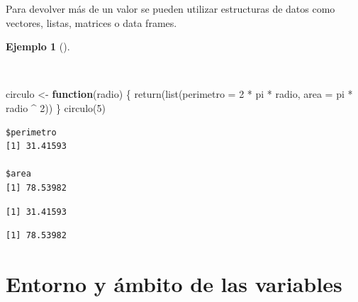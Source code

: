 \documentclass[
  spanish,
  a4paper,
]{scrreport}
\newenvironment{Shaded}{\begin{snugshade}}{\end{snugshade}}
\newcommand{\AttributeTok}[1]{\textcolor[rgb]{0.40,0.45,0.13}{#1}}
\newcommand{\ControlFlowTok}[1]{\textcolor[rgb]{0.00,0.23,0.31}{\textbf{#1}}}
\newcommand{\DecValTok}[1]{\textcolor[rgb]{0.68,0.00,0.00}{#1}}
\newcommand{\FunctionTok}[1]{\textcolor[rgb]{0.28,0.35,0.67}{#1}}
\newcommand{\NormalTok}[1]{\textcolor[rgb]{0.00,0.23,0.31}{#1}}
\newcommand{\OtherTok}[1]{\textcolor[rgb]{0.00,0.23,0.31}{#1}}
\newcommand{\SpecialCharTok}[1]{\textcolor[rgb]{0.37,0.37,0.37}{#1}}
\theoremstyle{definition}
\theoremstyle{definition}
\newtheorem{example}{Ejemplo}[chapter]
\theoremstyle{remark}
\begin{document}
Para devolver más de un valor se pueden utilizar estructuras de datos
como vectores, listas, matrices o data frames.

\begin{example}[]\protect\hypertarget{exm-retorno-funcion-lista}{}\label{exm-retorno-funcion-lista}

~

\begin{Shaded}
\begin{Highlighting}[]
\NormalTok{circulo }\OtherTok{\textless{}{-}} \ControlFlowTok{function}\NormalTok{(radio) \{}
  \FunctionTok{return}\NormalTok{(}\FunctionTok{list}\NormalTok{(}\AttributeTok{perimetro =} \DecValTok{2} \SpecialCharTok{*}\NormalTok{ pi }\SpecialCharTok{*}\NormalTok{ radio, }\AttributeTok{area =}\NormalTok{ pi }\SpecialCharTok{*}\NormalTok{ radio }\SpecialCharTok{\^{}} \DecValTok{2}\NormalTok{))}
\NormalTok{\}}
\FunctionTok{circulo}\NormalTok{(}\DecValTok{5}\NormalTok{)}
\end{Highlighting}
\end{Shaded}

\begin{verbatim}
$perimetro
[1] 31.41593

$area
[1] 78.53982
\end{verbatim}

\begin{Shaded}
\end{Shaded}

\begin{verbatim}
[1] 31.41593
\end{verbatim}

\begin{Shaded}
\end{Shaded}

\begin{verbatim}
[1] 78.53982
\end{verbatim}

\end{example}

\section{Entorno y ámbito de las
variables}\label{entorno-y-uxe1mbito-de-las-variables}
\end{document}
